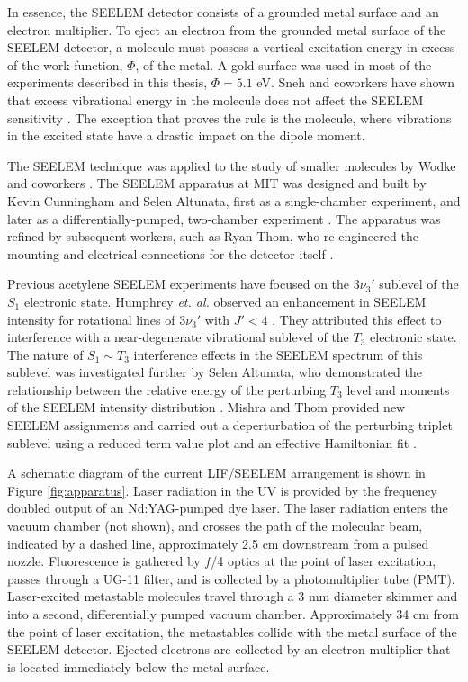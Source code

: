 In essence, the SEELEM detector consists of a grounded metal surface
and an electron multiplier.  To eject an electron from the grounded
metal surface of the SEELEM detector, a molecule must possess a
vertical excitation energy in excess of the work function, $\Phi$, of
the metal.  A gold surface was used in most of the experiments
described in this thesis, $\Phi = 5.1$ eV.  Sneh and coworkers have
shown that excess vibrational energy in the molecule does not affect
the SEELEM sensitivity \cite{sneh86}.  The exception that proves the
rule is the  molecule, where vibrations in the excited state
have a drastic impact on the dipole moment\cite{white05}.

The SEELEM technique was applied to the study of smaller molecules by
Wodke and coworkers \cite{price92, drabbels95, morgan96, humphrey97}.
The SEELEM apparatus at MIT was designed and built by Kevin Cunningham
and Selen Altunata, first as a single-chamber experiment, and later as
a differentially-pumped, two-chamber experiment
\cite{cunningham-thesis, altunata-thesis}.  The apparatus was refined
by subsequent workers, such as Ryan Thom, who re-engineered the
mounting and electrical connections for the detector itself
\cite{thom-thesis}.

Previous acetylene SEELEM experiments have focused on the $3\nu_3'$
 sublevel of the $S_1$ electronic state.  Humphrey \emph{et.
  al.} observed an enhancement in SEELEM intensity for rotational
lines of $3\nu_3'$  with $J' < 4$ \cite{humphrey97}.  They
attributed this effect to interference with a near-degenerate
vibrational sublevel of the $T_3$ electronic state.  The nature of
$S_1 \sim T_3$ interference effects in the SEELEM spectrum of this
sublevel was investigated further by Selen Altunata, who demonstrated
the relationship between the relative energy of the perturbing $T_3$
level and moments of the SEELEM intensity distribution
\cite{altunata00}.  Mishra and Thom provided new SEELEM assignments
and carried out a deperturbation of the perturbing triplet sublevel
using a reduced term value plot and an effective Hamiltonian fit
\cite{mishra04}.

A schematic diagram of the current LIF/SEELEM arrangement is shown in
Figure \ref{fig:apparatus}.  Laser radiation in the UV is provided by
the frequency doubled output of an Nd:YAG-pumped dye laser.  The laser
radiation enters the vacuum chamber (not shown), and crosses the path
of the molecular beam, indicated by a dashed line, approximately 2.5
cm downstream from a pulsed nozzle.  Fluorescence is gathered by $f$/4
optics at the point of laser excitation, passes through a UG-11
filter, and is collected by a photomultiplier tube (PMT).
Laser-excited metastable molecules travel through a 3 mm diameter
skimmer and into a second, differentially pumped vacuum chamber.
Approximately 34 cm from the point of laser excitation, the
metastables collide with the metal surface of the SEELEM detector.
Ejected electrons are collected by an electron multiplier that is
located immediately below the metal surface.

